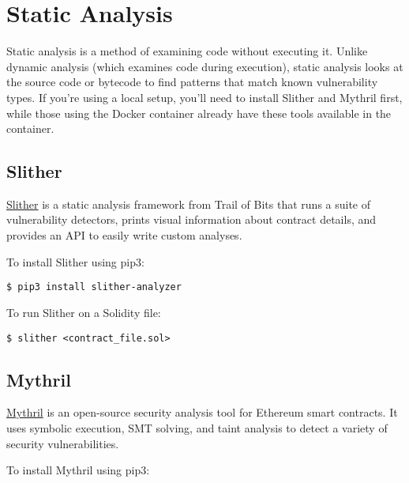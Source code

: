 \documentclass[12pt]{article}
\begin{document}
\section{Static Analysis}

Static analysis is a method of examining code without executing it. Unlike dynamic analysis (which examines code during execution), static analysis looks at the source code or bytecode to find patterns that match known vulnerability types. If you're using a local setup, you'll need to install Slither and Mythril first, while those using the Docker container already have these tools available in the container.


\subsection*{Slither}

\href{https://github.com/crytic/slither}{Slither} is a static analysis framework from Trail of Bits that runs a suite of vulnerability detectors, prints visual information about contract details, and provides an API to easily write custom analyses.

\medskip
\noindent
To install Slither using pip3:

\noindent \begin{minipage}{\textwidth}
\begin{verbatim}
$ pip3 install slither-analyzer
\end{verbatim}
\end{minipage}

\medskip
\noindent
To run Slither on a Solidity file:

\noindent \begin{minipage}{\textwidth}
\begin{verbatim}
$ slither <contract_file.sol>
\end{verbatim}
\end{minipage}

\subsection*{Mythril}

\href{https://github.com/ConsenSys/mythril}{Mythril} is an open-source security analysis tool for Ethereum smart contracts. It uses symbolic execution, SMT solving, and taint analysis to detect a variety of security vulnerabilities.

\medskip
\noindent
To install Mythril using pip3:
\end{document}
